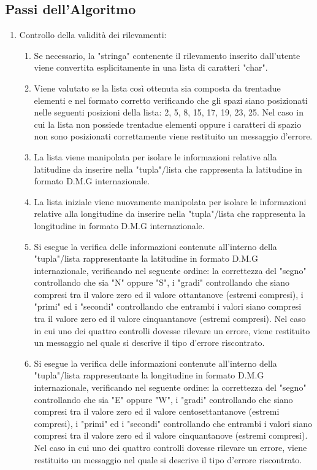 \documentclass{article}
\begin{document}
\subsection{Passi dell'Algoritmo}
\begin{enumerate}
	
	\item Controllo della validità dei rilevamenti:
	\begin{enumerate}
		\item Se necessario, la "stringa" contenente il rilevamento inserito dall'utente viene convertita esplicitamente in una lista di caratteri "char".
		\item Viene valutato se la lista così ottenuta sia composta da trentadue elementi e nel formato corretto verificando che gli spazi siano posizionati nelle  seguenti posizioni della lista: 2, 5, 8, 15, 17, 19, 23, 25. Nel caso in cui la lista non possiede trentadue elementi oppure i caratteri di spazio non sono posizionati correttamente viene restituito un messaggio d'errore.
		\item La lista viene manipolata per isolare le informazioni relative alla latitudine da inserire nella "tupla"/lista che rappresenta la latitudine in formato D.M.G internazionale.
		\item La lista iniziale viene nuovamente manipolata per isolare le informazioni relative alla longitudine da inserire nella "tupla"/lista che rappresenta la longitudine in formato D.M.G internazionale.
		\item Si esegue la verifica delle informazioni contenute all'interno della "tupla"/lista rappresentante la latitudine in formato D.M.G internazionale, verificando nel seguente ordine:  la correttezza del "segno" controllando che sia "N" oppure "S", i "gradi" controllando che siano compresi tra il valore zero ed il valore ottantanove (estremi compresi), i "primi" ed i "secondi" controllando che entrambi i valori siano compresi tra il valore zero ed il valore cinquantanove (estremi compresi). Nel caso in cui uno dei quattro controlli dovesse rilevare un errore, viene restituito un messaggio nel quale si descrive il tipo d'errore riscontrato.
		\item Si esegue la verifica delle informazioni contenute all'interno della "tupla"/lista rappresentante la longitudine in formato D.M.G internazionale, verificando nel seguente ordine:  la correttezza del "segno" controllando che sia "E" oppure "W", i "gradi" controllando che siano compresi tra il valore zero ed il valore centosettantanove (estremi compresi), i "primi" ed i "secondi" controllando che entrambi i valori siano compresi tra il valore zero ed il valore cinquantanove (estremi compresi). Nel caso in cui uno dei quattro controlli dovesse rilevare un errore, viene restituito un messaggio nel quale si descrive il tipo d'errore riscontrato.
	\end{enumerate}


\end{enumerate}
\end{document}
